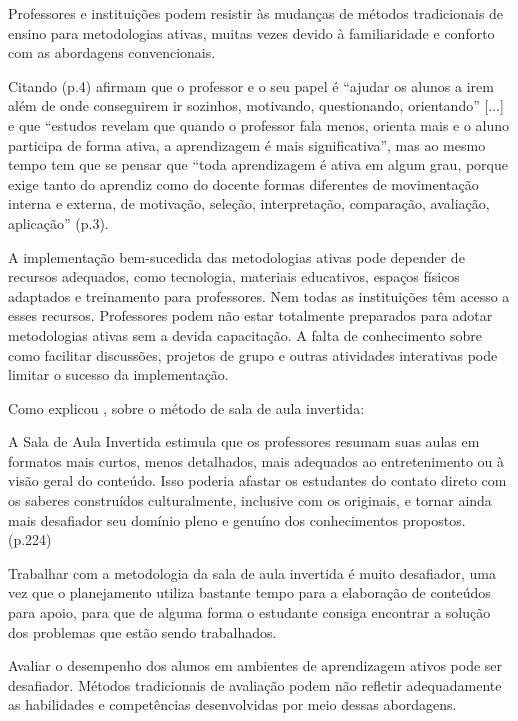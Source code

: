 Professores e instituições podem resistir às mudanças de métodos tradicionais de ensino para metodologias ativas, muitas vezes devido à familiaridade e conforto com as abordagens convencionais.

Citando  (p.4) afirmam que o professor e o seu papel é ``ajudar os alunos a irem além de onde conseguirem ir sozinhos, motivando, questionando, orientando'' [...] e que ``estudos revelam que quando o professor fala menos, orienta mais e o aluno participa de forma ativa, a aprendizagem é mais significativa'', mas ao mesmo tempo tem que se pensar que ``toda aprendizagem é ativa em algum grau, porque exige tanto do aprendiz como do docente formas diferentes de movimentação interna e externa, de motivação, seleção, interpretação, comparação, avaliação, aplicação'' \cite{BACICHMORAN2018} (p.3).

A implementação bem-sucedida das metodologias ativas pode depender de recursos adequados, como tecnologia, materiais educativos, espaços físicos adaptados e treinamento para professores. Nem todas as instituições têm acesso a esses recursos. Professores podem não estar totalmente preparados para adotar metodologias ativas sem a devida capacitação. A falta de conhecimento sobre como facilitar discussões, projetos de grupo e outras atividades interativas pode limitar o sucesso da implementação.

Como explicou , sobre o método de sala de aula invertida:

\begin{citacao}
    A Sala de Aula Invertida estimula que os professores resumam suas aulas em formatos mais curtos, menos detalhados, mais adequados ao entretenimento ou à visão geral do conteúdo. Isso poderia afastar os estudantes do contato direto com os saberes construídos culturalmente, inclusive com os originais, e tornar ainda mais desafiador seu domínio pleno e genuíno dos conhecimentos propostos. \cite{VALERIO-MOREIRA2018} (p.224)
\end{citacao}

Trabalhar com a metodologia da sala de aula invertida é muito desafiador, uma vez que o planejamento utiliza bastante tempo para a elaboração de conteúdos para apoio, para que de alguma forma o estudante consiga encontrar a solução dos problemas que estão sendo trabalhados.

Avaliar o desempenho dos alunos em ambientes de aprendizagem ativos pode ser desafiador. Métodos tradicionais de avaliação podem não refletir adequadamente as habilidades e competências desenvolvidas por meio dessas abordagens.


